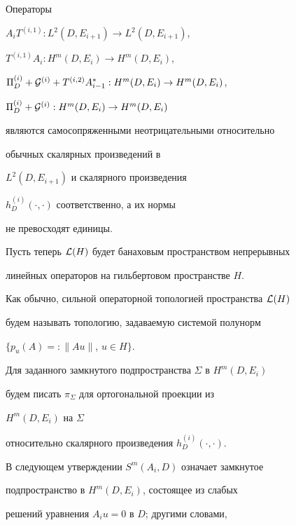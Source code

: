 \begin{cor}


\label{c.6.1i}


Операторы


$A_i T^{(i,1)}:L^{2} (D, E_{i+1})\to L^{2} (D, E_{i+1})$,


$T^{(i,1)} A_i:H^{m} (D, E_i)\to H^{m} (D, E_i)$,


$\Pi ^{(i)}_{D}+{\cal G}^{(i)}+T^{(i,2)} A^*_{i-1}:


H^{m} (D, E_i)\to H^{m} (D,E_i)$,


$\Pi ^{(i)}_{D}+{\cal G}^{(i)}:H^{m} (D, E_i)\to H^{m} (D,E_i)$


являются самосопряженными неотрицательными относительно


обычных скалярных произведений в


$L^2 (D, E_{i+1})$ и скалярного произведения


$h^{(i)}_{D} (\cdot,\cdot)$ соответственно, а их нормы


не превосходят единицы.


\end{cor}





Пусть теперь ${\cal L} (H)$ будет банаховым пространством непрерывных 


линейных операторов на гильбертовом пространстве $H$.


Как обычно, сильной операторной топологией пространства ${\cal L}(H)$


будем называть топологию, задаваемую системой полунорм


$\{ p_u (A)=: \| Au\|$, $u \in H\}$.





Для заданного замкнутого подпространства $\Sigma$ в $H^{m} (D, E_i)$


будем писать $\pi_{\Sigma}$ для ортогональной проекции из


$H^{m} (D, E_i)$ на  $\Sigma$


относительно скалярного произведения $h^{(i)}_{D} (\cdot,\cdot)$.





В следующем утверждении $S^m (A_i, D)$ означает замкнутое


подпространство в $H^m (D,E_i)$, состоящее из слабых


решений уравнения $A_i u=0$ в $D$; другими словами,


